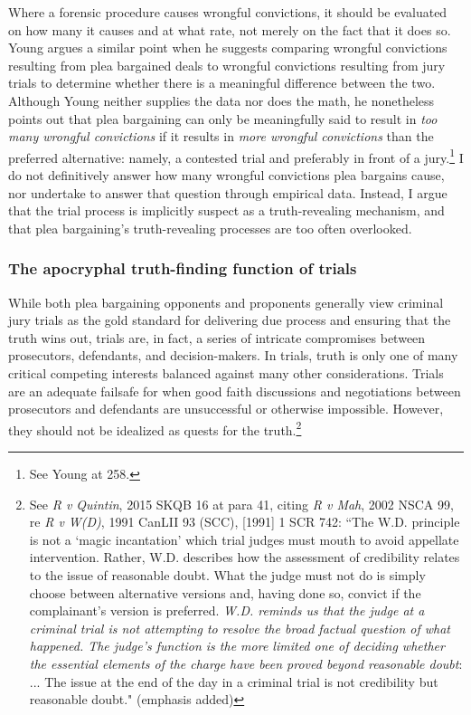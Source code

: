 Where a forensic procedure causes wrongful convictions, it should be evaluated on how many it causes and at what rate, not merely on the fact that it does so. Young argues a similar point when he suggests comparing wrongful convictions resulting from plea bargained deals to wrongful convictions resulting from jury trials to determine whether there is a meaningful difference between the two. Although Young neither supplies the data nor does the math, he nonetheless points out that plea bargaining can only be meaningfully said to result in \textit{too many wrongful convictions} if it results in \textit{more wrongful convictions} than the preferred alternative: namely, a contested trial and preferably in front of a jury.\footnote{See Young at 258.} I do not definitively answer how many wrongful convictions plea bargains cause, nor undertake to answer that question through empirical data. Instead, I argue that the trial process is implicitly suspect as a truth-revealing mechanism, and that plea bargaining's truth-revealing processes are too often overlooked. 

\subsubsection{The apocryphal truth-finding function of trials}

While both plea bargaining opponents and proponents generally view criminal jury trials as the gold standard for delivering due process and ensuring that the truth wins out, trials are, in fact, a series of intricate compromises between prosecutors, defendants, and decision-makers. In trials, truth is only one of many critical competing interests balanced against many other considerations. Trials are an adequate failsafe for when good faith discussions and negotiations between prosecutors and defendants are unsuccessful or otherwise impossible. However, they should not be idealized as quests for the truth.\footnote{See \textit{R v Quintin}, 2015 SKQB 16 at para 41, citing \textit{R v Mah}, 2002 NSCA 99, re \textit{R v W(D)}, 1991 CanLII 93 (SCC), [1991] 1 SCR 742: ``The W.D. principle is not a `magic incantation' which trial judges must mouth to avoid appellate intervention. Rather, W.D. describes how the assessment of credibility relates to the issue of reasonable doubt. What the judge must not do is simply choose between alternative versions and, having done so, convict if the complainant’s version is preferred. \textit{W.D. reminds us that the judge at a criminal trial is not attempting to resolve the broad factual question of what happened. The judge’s function is the more limited one of deciding whether the essential elements of the charge have been proved beyond reasonable doubt}: ... The issue at the end of the day in a criminal trial is not credibility but reasonable doubt." (emphasis added)}

